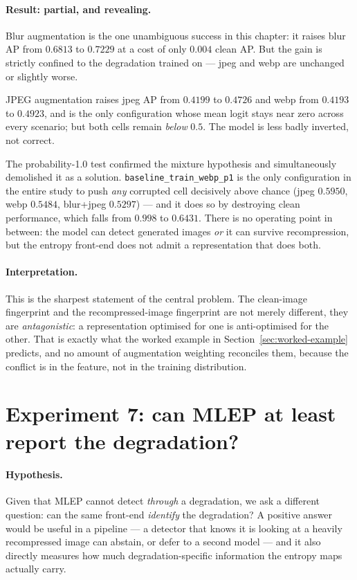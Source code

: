 \paragraph{Result: partial, and revealing.} Blur augmentation is the one
unambiguous success in this chapter: it raises blur AP from $0.6813$ to
$0.7229$ at a cost of only $0.004$ clean AP. But the gain is strictly confined
to the degradation trained on --- jpeg and webp are unchanged or slightly worse.

JPEG augmentation raises jpeg AP from $0.4199$ to $0.4726$ and webp from
$0.4193$ to $0.4923$, and is the only configuration whose mean logit stays near
zero across every scenario; but both cells remain \emph{below} $0.5$. The model
is less badly inverted, not correct.

The probability-1.0 test confirmed the mixture hypothesis and simultaneously
demolished it as a solution. \texttt{baseline\_train\_webp\_p1} is the only
configuration in the entire study to push \emph{any} corrupted cell decisively
above chance (jpeg $0.5950$, webp $0.5484$, blur+jpeg $0.5297$) --- and it does
so by destroying clean performance, which falls from $0.998$ to $0.6431$. There
is no operating point in between: the model can detect generated images
\emph{or} it can survive recompression, but the entropy front-end does not admit
a representation that does both.

\paragraph{Interpretation.} This is the sharpest statement of the central
problem. The clean-image fingerprint and the recompressed-image fingerprint are
not merely different, they are \emph{antagonistic}: a representation optimised
for one is anti-optimised for the other. That is exactly what the worked example
in Section~\ref{sec:worked-example} predicts, and no amount of augmentation
weighting reconciles them, because the conflict is in the feature, not in the
training distribution.

\section{Experiment 7: can MLEP at least report the degradation?}
\label{sec:exp-degradation}

\paragraph{Hypothesis.} Given that MLEP cannot detect \emph{through} a
degradation, we ask a different question: can the same front-end \emph{identify}
the degradation? A positive answer would be useful in a pipeline --- a detector
that knows it is looking at a heavily recompressed image can abstain, or defer
to a second model --- and it also directly measures how much
degradation-specific information the entropy maps actually carry.

